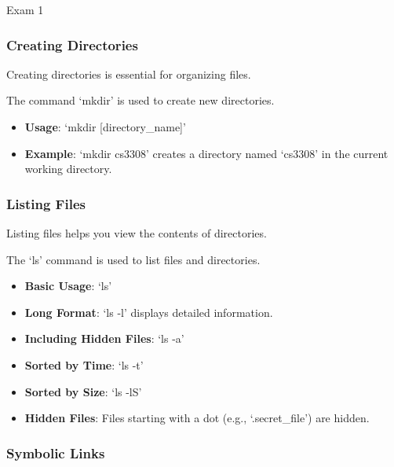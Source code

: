 \begin{examnotes}{Exam 1}
    \subsubsection*{Creating Directories}
    
    Creating directories is essential for organizing files.
    
    \begin{highlight}
        The command `mkdir' is used to create new directories.
        
        \begin{itemize}
            \item \textbf{Usage}: `mkdir [directory\_name]'
            \item \textbf{Example}: `mkdir cs3308' creates a directory named `cs3308' in the current working directory.
        \end{itemize}
    \end{highlight}
    
    \subsubsection*{Listing Files}
    
    Listing files helps you view the contents of directories.
    
    \begin{highlight}
        The `ls' command is used to list files and directories.
        
        \begin{itemize}
            \item \textbf{Basic Usage}: `ls'
            \item \textbf{Long Format}: `ls -l' displays detailed information.
            \item \textbf{Including Hidden Files}: `ls -a'
            \item \textbf{Sorted by Time}: `ls -t'
            \item \textbf{Sorted by Size}: `ls -lS'
            \item \textbf{Hidden Files}: Files starting with a dot (e.g., `.secret\_file') are hidden.
        \end{itemize}
    \end{highlight}
    
    \subsubsection*{Symbolic Links}
    

\end{examnotes}
